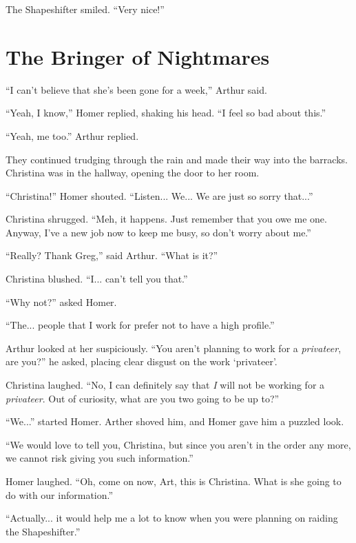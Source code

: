 \documentclass[showtrims,b6paper,draft,10pt]{memoir}
\begin{document}
The Shapeshifter smiled. ``Very nice!''
\chapter{The Bringer of Nightmares}

``I can't believe that she's been gone for a week,'' Arthur said.

``Yeah, I know,'' Homer replied, shaking his head.  ``I feel so bad about this.''

``Yeah, me too.'' Arthur replied.

They continued trudging through the rain and made their way into the barracks.  Christina was in the hallway, opening the door to her room.

``Christina!'' Homer shouted.  ``Listen... We... We are just so sorry that...''

Christina shrugged.  ``Meh, it happens.  Just remember that you owe me one.  Anyway, I've a new job now to keep me busy, so don't worry about me.''

``Really?  Thank Greg,'' said Arthur.  ``What is it?''

Christina blushed.  ``I... can't tell you that.''

``Why not?'' asked Homer.

``The... people that I work for prefer not to have a high profile.''

Arthur looked at her suspiciously.  ``You aren't planning to work for a \emph{privateer}, are you?'' he asked, placing clear disgust on the work `privateer'.

Christina laughed.  ``No, I can definitely say that \emph{I} will not be working for a \emph{privateer}.  Out of curiosity, what are you two going to be up to?''

``We...'' started Homer.  Arther shoved him, and Homer gave him a puzzled look.

``We would love to tell you, Christina, but since you aren't in the order any more, we cannot risk giving you such information.''

Homer laughed.  ``Oh, come on now, Art, this is Christina.  What is she going to do with our information.''

``Actually... it would help me a lot to know when you were planning on raiding the Shapeshifter.''
\end{document}
